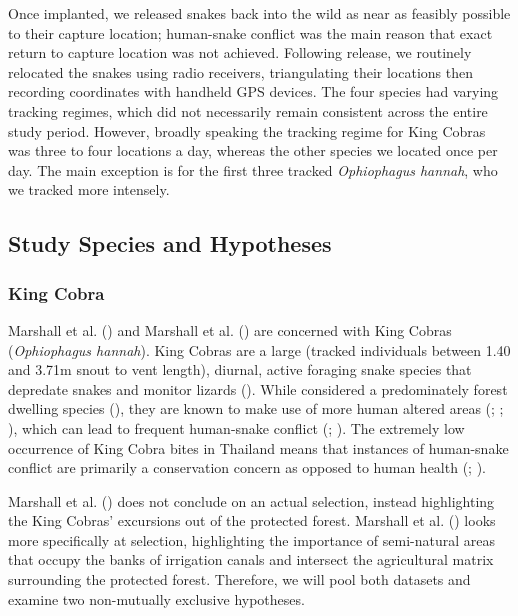 \documentclass[10pt,a4paper]{article}
\begin{document}
Once implanted, we released snakes back into the wild as near as feasibly possible to their capture location; human-snake conflict was the main reason that exact return to capture location was not achieved.
Following release, we routinely relocated the snakes using radio receivers, triangulating their locations then recording coordinates with handheld GPS devices.
The four species had varying tracking regimes, which did not necessarily remain consistent across the entire study period.
However, broadly speaking the tracking regime for King Cobras was three to four locations a day, whereas the other species we located once per day.
The main exception is for the first three tracked \emph{Ophiophagus hannah}, who we tracked more intensely.

\subsection{Study Species and Hypotheses}\label{study-species-and-hypotheses}

\subsubsection{King Cobra}\label{king-cobra}

Marshall et al. () and Marshall et al. () are concerned with King Cobras (\emph{Ophiophagus hannah}).
King Cobras are a large (tracked individuals between 1.40 and 3.71m snout to vent length), diurnal, active foraging snake species that depredate snakes and monitor lizards ().
While considered a predominately forest dwelling species (), they are known to make use of more human altered areas (; ; ), which can lead to frequent human-snake conflict (; ).
The extremely low occurrence of King Cobra bites in Thailand means that instances of human-snake conflict are primarily a conservation concern as opposed to human health (; ).

Marshall et al. () does not conclude on an actual selection, instead highlighting the King Cobras' excursions out of the protected forest.
Marshall et al. () looks more specifically at selection, highlighting the importance of semi-natural areas that occupy the banks of irrigation canals and intersect the agricultural matrix surrounding the protected forest.
Therefore, we will pool both datasets and examine two non-mutually exclusive hypotheses.
\end{document}
